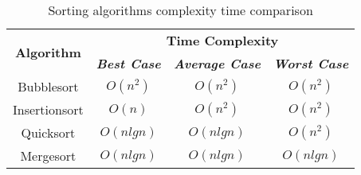 \begin{table}[htbp]
    \caption{Sorting algorithms complexity time comparison \cite{Prajapati2017}}
    \begin{center}
    \begin{tabular}{|c|c|c|c|}
    \hline
    \multirow{2}{*}{\textbf{Algorithm}}&\multicolumn{3}{|c|}{\textbf{Time Complexity}} \\
    \cline{2-4} 
    & \textbf{\textit{Best Case}} & \textbf{\textit{Average Case}}& \textbf{\textit{Worst Case}} \\
    \hline
    Bubblesort & $O(n^2)$ & $O(n^2)$ & $O(n^2)$ \\
    Insertionsort & $O(n)$ & $O(n^2)$ & $O(n^2)$ \\
    Quicksort & $O(nlgn)$ & $O(nlgn)$ & $O(n^2)$ \\
    Mergesort & $O(nlgn)$ & $O(nlgn)$ & $O(nlgn)$ \\
    \hline
    \end{tabular}
    \label{table1}
    \end{center}
\end{table}